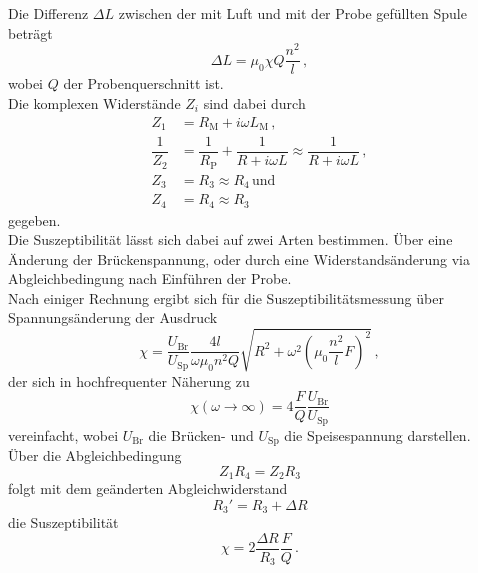 Die Differenz $\Delta L$ zwischen der mit Luft und mit der Probe gefüllten Spule beträgt
\begin{equation*}
    \Delta L = \mu_0 \chi Q \dfrac{n^2}{l} \,,
\end{equation*}
wobei $Q$ der Probenquerschnitt ist. \\

Die komplexen Widerstände $Z_i$ sind dabei durch
\begin{align*}
    Z_1             &= R_\text{M} + i \omega L_\text{M} \, , \\
    \dfrac{1}{Z_2}  &= \dfrac{1}{R_\text{P}} + \dfrac{1}{R + i \omega L} \approx \dfrac{1}{ R + i \omega L} \, ,\\
    Z_3             &= R_3                                               \approx R_4 \, \text{und} \\
    Z_4             &= R_4                                               \approx R_3 
\end{align*}
gegeben. \\

Die Suszeptibilität lässt sich dabei auf zwei Arten bestimmen.
Über eine Änderung der Brückenspannung, oder durch eine Widerstandsänderung via Abgleichbedingung nach Einführen der Probe. \\

Nach einiger Rechnung ergibt sich für die Suszeptibilitätsmessung über Spannungsänderung der Ausdruck
\begin{equation*}
    \chi = \dfrac{U_\text{Br}}{U_\text{Sp}} \dfrac{4 l}{\omega \mu_0 n^2 Q} \sqrt{R^2 + \omega^2 \left(\mu_0 \dfrac{n^2}{l} F \right)^2} \,,
    \label{eq:spannsusamogus}
\end{equation*}
der sich in hochfrequenter Näherung zu
\begin{equation}
    \chi(\omega \rightarrow \infty) = 4 \dfrac{F}{Q} \dfrac{U_\text{Br}}{U_\text{Sp}}
    \label{eq:spannsussimp}
\end{equation}
vereinfacht, wobei $U_\text{Br}$ die Brücken- und $U_\text{Sp}$ die Speisespannung darstellen. \\

Über die Abgleichbedingung 
\begin{equation*}
    Z_1 R_4 = Z_2 R_3
\end{equation*}
folgt mit dem geänderten Abgleichwiderstand
\begin{equation*}
    R_3' = R_3 + \Delta R
\end{equation*}
die Suszeptibilität
\begin{equation}
    \chi = 2 \dfrac{\Delta R}{R_3} \dfrac{F}{Q} \,.
    \label{eq:widsus}
\end{equation}




